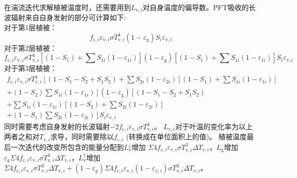 在湍流迭代求解植被温度时，还需要用到$L_{{\mathrm v},i}$对自身温度的偏导数。PFT吸收的长波辐射来自自身发射的部分可计算如下: \\
%
对于第1层植被：
\begin{equation}\label{eq:dlv1}
  f_{{\mathrm c},i} \varepsilon_{{\mathrm v},i} \sigma T_{{\mathrm v},i}^{4}\left(1-\varepsilon_{\mathrm{g}}\right) S_{i} \varepsilon_{\mathrm{v},i}
\end{equation}
对于第2层植被：
\begin{equation}\label{eq:dlv2}
  f_{{\mathrm c},i} \varepsilon_{{\mathrm v},i} \sigma T_{{\mathrm v},i}^{4}\left[\left(1-S_{1}\right)+\sum S_{1 i}\left(1-\varepsilon_{1 i}\right)\right]
  \left(1-\varepsilon_{\mathrm{g}}\right)\left[\left(1-S_{1}\right)+\sum S_{1 i}\left(1-\varepsilon_{1 i}\right)\right] S_{i} \varepsilon_{\mathrm{v},i}
\end{equation}
对于第3层植被：
\begin{equation}\label{eq:dlv3}
  \begin{aligned}
    f_{\mathrm{c},i} \varepsilon_{\mathrm{v},i} \sigma T_{\mathrm{v},i}^{4}\left[\left(1-S_{1}-S_{2}+S_{1} S_{2}\right)+
    \sum S_{2 i}\left(1-\varepsilon_{2 i}\right)\left[\left(1-S_{1}\right)+\sum S_{1 i}\left(1-\varepsilon_{1 i}\right)\right]\right.\\[1ex]
    \left.+\left(1-S_{2}\right) \sum S_{1 i}\left(1-\varepsilon_{1 i}\right)\right]\left(1-\varepsilon_{\mathrm{g}}\right)\left[\left(1-S_{1}-S_{2}+S_{1} S_{2}\right)\right.\\[1ex]
    +\sum S_{1 i}\left(1-\varepsilon_{1 i}\right)\left[\left(1-S_{2}\right)+\sum S_{2 i}\left(1-\varepsilon_{2 i}\right)\right] \\[1ex]
    \left.+\left(1-S_{1}\right)
    \sum S_{2 i}\left(1-\varepsilon_{2 i}\right)\right] S_{i} \varepsilon_{\mathrm{v},i}
  \end{aligned}
\end{equation}
同时需要考虑自身发射的长波辐射$-2f_{\mathrm{c},i}\varepsilon_{\mathrm{v},i}\sigma T_{\mathrm{v},i}^4$。
$L_{\mathrm{v},i}$对于叶温的变化率为以上两者之和对$T_{\mathrm{v},i}$求导，同时需要除以$f_{\mathrm{c},i}$ (转换成在单位面积上的值)。
植被温度最后一次迭代的改变所包含的能量分配到$L_{\mathrm {v}} ^\downarrow$增加
$\Sigma4f_{\mathrm{c},i}\varepsilon_{\mathrm{v},i}\sigma T_{\mathrm{v},i}^3\Delta T_{\mathrm{v},i}$，$L_{\mathrm{g}}$增加$\varepsilon_{\mathrm {g}}\Sigma4f_{\mathrm{c},i}\varepsilon_{\mathrm{v},i}\sigma T_{\mathrm{v},i}^3\Delta T_{\mathrm{v},i}$，$L_{\mathrm {v}} ^\uparrow$增加$\Sigma 4 f_{\mathrm{c},i} \varepsilon_{\mathrm{v},i} \sigma T_{\mathrm{v},i}^{3} \Delta T_{\mathrm{v},i}+\left(1-\varepsilon_{\mathrm{g}}\right) \Sigma 4 f_{\mathrm{c},i} \varepsilon_{\mathrm{v},i}\left(1-\varepsilon_{\mathrm{v},i}\right) \sigma T_{\mathrm{v},i}^{3} \Delta T_{\mathrm{v},i}$。


